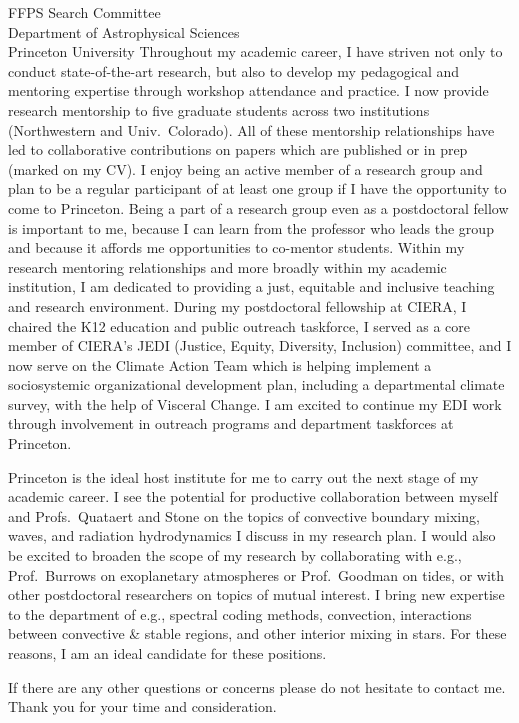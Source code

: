 \documentclass[12pt]{letter}
\begin{document}
\begin{letter}{
               FFPS Search Committee \\
               Department of Astrophysical Sciences \\
               Princeton University
           }
    Throughout my academic career, I have striven not only to conduct state-of-the-art research, but also to develop my pedagogical and mentoring expertise through workshop attendance and practice.
    I now provide research mentorship to five graduate students across two institutions (Northwestern and Univ.~Colorado).
    All of these mentorship relationships have led to collaborative contributions on papers which are published or in prep (marked on my CV).
    I enjoy being an active member of a research group and plan to be a regular participant of at least one group if I have the opportunity to come to Princeton.
    Being a part of a research group even as a postdoctoral fellow is important to me, because I can learn from the professor who leads the group and because it affords me opportunities to co-mentor students.
    Within my research mentoring relationships and more broadly within my academic institution, I am dedicated to providing a just, equitable and inclusive teaching and research environment.
    During my postdoctoral fellowship at CIERA, I chaired the K12 education and public outreach taskforce, I served as a core member of CIERA's JEDI (Justice, Equity, Diversity, Inclusion) committee, and I now serve on the Climate Action Team which is helping implement a sociosystemic organizational development plan, including a departmental climate survey, with the help of Visceral Change.
    I am excited to continue my EDI work through involvement in outreach programs and department taskforces at Princeton.

    Princeton is the ideal host institute for me to carry out the next stage of my academic career.
    I see the potential for productive collaboration between myself and Profs.~Quataert and Stone on the topics of convective boundary mixing, waves, and radiation hydrodynamics I discuss in my research plan.
    I would also be excited to broaden the scope of my research by collaborating with e.g., Prof.~Burrows on exoplanetary atmospheres or Prof.~Goodman on tides, or with other postdoctoral researchers on topics of mutual interest.
    I bring new expertise to the department of e.g., spectral coding methods, convection, interactions between convective \& stable regions, and other interior mixing in stars.
    For these reasons, I am an ideal candidate for these positions.

    If there are any other questions or concerns please do not hesitate to contact me.
    Thank you for your time and consideration.


\end{letter}
\end{document}
